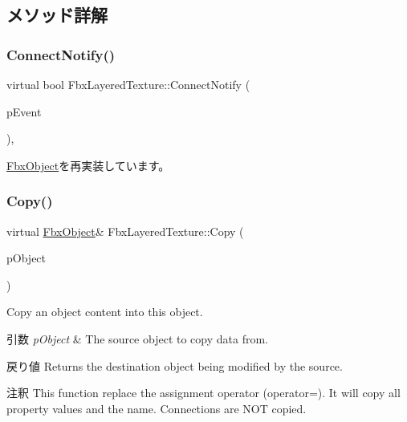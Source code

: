 \subsection{メソッド詳解}
\mbox{\label{class_fbx_layered_texture_a78ed9cd6298697060ebc278617d72d44}} 
\subsubsection{\texorpdfstring{Connect\+Notify()}{ConnectNotify()}}
{\footnotesize\ttfamily virtual bool Fbx\+Layered\+Texture\+::\+Connect\+Notify (\begin{DoxyParamCaption}\item[{\hyperlink{class_fbx_connect_event}{Fbx\+Connect\+Event} const \&}]{p\+Event }\end{DoxyParamCaption})\hspace{0.3cm}{\ttfamily [protected]}, {\ttfamily [virtual]}}



\hyperlink{class_fbx_object_ab7a400f3829d1f0da57d3d78c8168dd0}{Fbx\+Object}を再実装しています。

\mbox{\label{class_fbx_layered_texture_a61ca1d210dcae83133ad2ee1c9c7daa9}} 
\subsubsection{\texorpdfstring{Copy()}{Copy()}}
{\footnotesize\ttfamily virtual \hyperlink{class_fbx_object}{Fbx\+Object}\& Fbx\+Layered\+Texture\+::\+Copy (\begin{DoxyParamCaption}\item[{const \hyperlink{class_fbx_object}{Fbx\+Object} \&}]{p\+Object }\end{DoxyParamCaption})\hspace{0.3cm}{\ttfamily [virtual]}}

Copy an object content into this object. 
\begin{DoxyParams}{引数}
{\em p\+Object} & The source object to copy data from. \\
\hline
\end{DoxyParams}
\begin{DoxyReturn}{戻り値}
Returns the destination object being modified by the source. 
\end{DoxyReturn}
\begin{DoxyRemark}{注釈}
This function replace the assignment operator (operator=). It will copy all property values and the name. Connections are N\+OT copied. 
\end{DoxyRemark}


